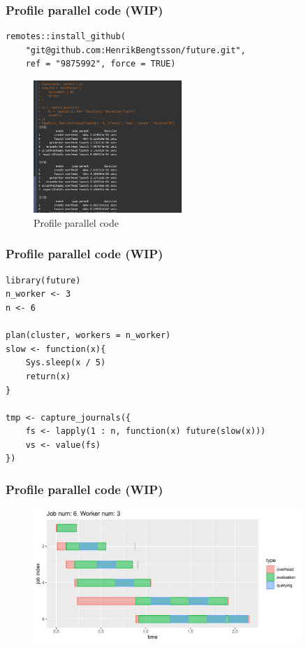 \documentclass[aspectratio=169,xcolor={dvipsnames,table}]{beamer}
\begin{document}
\begin{frame}[fragile]
  \frametitle{Profile parallel code (WIP)}
  \begin{verbatim}
remotes::install_github(
    "git@github.com:HenrikBengtsson/future.git", 
    ref = "9875992", force = TRUE)
\end{verbatim}
  \begin{figure}[htbp]
    \centering
    \includegraphics[width = 0.5\textwidth]{future_journal}
    \caption{Profile parallel code}
  \end{figure}
\end{frame}

\begin{frame}
  \frametitle{Profile parallel code (WIP)}
\begin{verbatim}
library(future)
n_worker <- 3
n <- 6

plan(cluster, workers = n_worker)
slow <- function(x){
    Sys.sleep(x / 5)
    return(x)
}

tmp <- capture_journals({
    fs <- lapply(1 : n, function(x) future(slow(x)))
    vs <- value(fs)  
})
\end{verbatim}
\end{frame}

\begin{frame}
  \frametitle{Profile parallel code (WIP)}
  \begin{figure}[htbp]
    \centering
    \includegraphics[width = 0.9\textwidth]{fig_type}
  \end{figure}
\end{frame}
\end{document}
